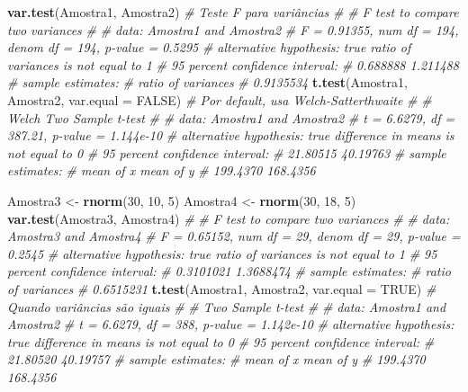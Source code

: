 \documentclass[
]{book}
\newenvironment{Shaded}{\begin{snugshade}}{\end{snugshade}}
\newcommand{\CommentTok}[1]{\textcolor[rgb]{0.56,0.35,0.01}{\textit{#1}}}
\newcommand{\DataTypeTok}[1]{\textcolor[rgb]{0.13,0.29,0.53}{#1}}
\newcommand{\DecValTok}[1]{\textcolor[rgb]{0.00,0.00,0.81}{#1}}
\newcommand{\KeywordTok}[1]{\textcolor[rgb]{0.13,0.29,0.53}{\textbf{#1}}}
\newcommand{\NormalTok}[1]{#1}
\newcommand{\OtherTok}[1]{\textcolor[rgb]{0.56,0.35,0.01}{#1}}
\newcommand{\StringTok}[1]{\textcolor[rgb]{0.31,0.60,0.02}{#1}}
\numberwithin{equation}{section}
\begin{document}
\begin{Shaded}
\begin{Highlighting}[]
\KeywordTok{var.test}\NormalTok{(Amostra1, Amostra2) }\CommentTok{\# Teste F para variâncias}
\CommentTok{\# }
\CommentTok{\#   F test to compare two variances}
\CommentTok{\# }
\CommentTok{\# data:  Amostra1 and Amostra2}
\CommentTok{\# F = 0.91355, num df = 194, denom df = 194, p{-}value = 0.5295}
\CommentTok{\# alternative hypothesis: true ratio of variances is not equal to 1}
\CommentTok{\# 95 percent confidence interval:}
\CommentTok{\#  0.688888 1.211488}
\CommentTok{\# sample estimates:}
\CommentTok{\# ratio of variances }
\CommentTok{\#          0.9135534}
\KeywordTok{t.test}\NormalTok{(Amostra1, Amostra2, }\DataTypeTok{var.equal =} \OtherTok{FALSE}\NormalTok{) }\CommentTok{\# Por default, usa Welch{-}Satterthwaite}
\CommentTok{\# }
\CommentTok{\#   Welch Two Sample t{-}test}
\CommentTok{\# }
\CommentTok{\# data:  Amostra1 and Amostra2}
\CommentTok{\# t = 6.6279, df = 387.21, p{-}value = 1.144e{-}10}
\CommentTok{\# alternative hypothesis: true difference in means is not equal to 0}
\CommentTok{\# 95 percent confidence interval:}
\CommentTok{\#  21.80515 40.19763}
\CommentTok{\# sample estimates:}
\CommentTok{\# mean of x mean of y }
\CommentTok{\#  199.4370  168.4356}

\NormalTok{Amostra3 \textless{}{-}}\StringTok{ }\KeywordTok{rnorm}\NormalTok{(}\DecValTok{30}\NormalTok{, }\DecValTok{10}\NormalTok{, }\DecValTok{5}\NormalTok{)}
\NormalTok{Amostra4 \textless{}{-}}\StringTok{ }\KeywordTok{rnorm}\NormalTok{(}\DecValTok{30}\NormalTok{, }\DecValTok{18}\NormalTok{, }\DecValTok{5}\NormalTok{)}
\KeywordTok{var.test}\NormalTok{(Amostra3, Amostra4)}
\CommentTok{\# }
\CommentTok{\#   F test to compare two variances}
\CommentTok{\# }
\CommentTok{\# data:  Amostra3 and Amostra4}
\CommentTok{\# F = 0.65152, num df = 29, denom df = 29, p{-}value = 0.2545}
\CommentTok{\# alternative hypothesis: true ratio of variances is not equal to 1}
\CommentTok{\# 95 percent confidence interval:}
\CommentTok{\#  0.3101021 1.3688474}
\CommentTok{\# sample estimates:}
\CommentTok{\# ratio of variances }
\CommentTok{\#          0.6515231}
\KeywordTok{t.test}\NormalTok{(Amostra1, Amostra2, }\DataTypeTok{var.equal =} \OtherTok{TRUE}\NormalTok{) }\CommentTok{\# Quando variâncias são iguais}
\CommentTok{\# }
\CommentTok{\#   Two Sample t{-}test}
\CommentTok{\# }
\CommentTok{\# data:  Amostra1 and Amostra2}
\CommentTok{\# t = 6.6279, df = 388, p{-}value = 1.142e{-}10}
\CommentTok{\# alternative hypothesis: true difference in means is not equal to 0}
\CommentTok{\# 95 percent confidence interval:}
\CommentTok{\#  21.80520 40.19757}
\CommentTok{\# sample estimates:}
\CommentTok{\# mean of x mean of y }
\CommentTok{\#  199.4370  168.4356}
\end{Highlighting}
\end{Shaded}
\end{document}
